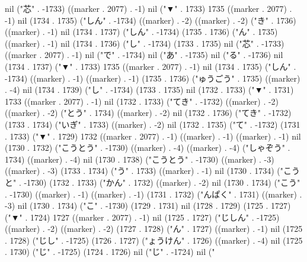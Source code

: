nil ("芯" . -1733) ((marker . 2077) . -1) nil ("▼" . 1733) 1735 ((marker . 2077) . -1) nil (1734 . 1735) ("しん" . -1734) ((marker) . -2) ((marker) . -2) ("き" . 1736) ((marker) . -1) nil (1734 . 1737) ("しん" . -1734) (1735 . 1736) ("ん" . 1735) ((marker) . -1) nil (1734 . 1736) ("し" . -1734) (1733 . 1735) nil ("芯" . -1733) ((marker . 2077) . -1) nil ("で" . -1734) nil ("あ" . -1735) nil ("る" . -1736) nil (1734 . 1737) ("▼" . 1733) 1735 ((marker . 2077) . -1) nil (1734 . 1735) ("しん" . -1734) ((marker) . -1) ((marker) . -1) (1735 . 1736) ("ゅうごう" . 1735) ((marker) . -4) nil (1734 . 1739) ("し" . -1734) (1733 . 1735) nil (1732 . 1733) ("▼" . 1731) 1733 ((marker . 2077) . -1) nil (1732 . 1733) ("てき" . -1732) ((marker) . -2) ((marker) . -2) ("とう" . 1734) ((marker) . -2) nil (1732 . 1736) ("てき" . -1732) (1733 . 1734) ("いぎ" . 1733) ((marker) . -2) nil (1732 . 1735) ("て" . -1732) (1731 . 1733) ("▼" . 1729) 1732 ((marker . 2077) . -1) ((marker) . -1) ((marker) . -1) nil (1730 . 1732) ("こうとう" . -1730) ((marker) . -4) ((marker) . -4) ("しゃぞう" . 1734) ((marker) . -4) nil (1730 . 1738) ("こうとう" . -1730) ((marker) . -3) ((marker) . -3) (1733 . 1734) ("う" . 1733) ((marker) . -1) nil (1730 . 1734) ("こうと" . -1730) (1732 . 1733) ("かん" . 1732) ((marker) . -2) nil (1730 . 1734) ("こう" . -1730) ((marker) . -1) ((marker) . -1) (1731 . 1732) ("んぱく" . 1731) ((marker) . -3) nil (1730 . 1734) ("こ" . -1730) (1729 . 1731) nil (1728 . 1729) (1725 . 1727) ("▼" . 1724) 1727 ((marker . 2077) . -1) nil (1725 . 1727) ("じしん" . -1725) ((marker) . -2) ((marker) . -2) (1727 . 1728) ("ん" . 1727) ((marker) . -1) nil (1725 . 1728) ("じし" . -1725) (1726 . 1727) ("ょうけん" . 1726) ((marker) . -4) nil (1725 . 1730) ("じ" . -1725) (1724 . 1726) nil ("じ" . -1724) nil ("
